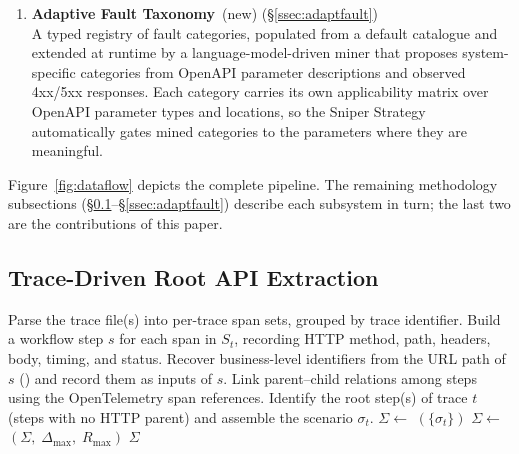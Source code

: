 \documentclass[conference]{IEEEtran}
\begin{document}
\begin{enumerate}[leftmargin=*]
  \item \textbf{Adaptive Fault Taxonomy}~(new)
        \hfill(\S\ref{ssec:adaptfault})\\
        A typed registry of fault categories, populated from a default catalogue and extended at runtime by a language-model-driven miner that proposes system-specific categories from OpenAPI parameter descriptions and observed 4xx/5xx responses. Each category carries its own applicability matrix over OpenAPI parameter types and locations, so the Sniper Strategy automatically gates mined categories to the parameters where they are meaningful.
\end{enumerate}

\noindent%
Figure~\ref{fig:dataflow} depicts the complete pipeline. The remaining methodology subsections (\S\ref{ssec:extract}--\S\ref{ssec:adaptfault}) describe each subsystem in turn; the last two are the contributions of this paper.

\subsection{Trace-Driven Root API Extraction}
\label{ssec:extract}
\begin{algorithm}[tb]
\caption{Trace workflow extraction}\label{alg:extract}
\footnotesize
\begin{algorithmic}[1]
\Require{}
\Ensure{}
\State Parse the trace file(s) into per-trace span sets, grouped by trace identifier.
    \State Build a workflow step $s$ for each span in $S_t$, recording HTTP method, path, headers, body, timing, and status.
    \State Recover business-level identifiers from the URL path of $s$ () and record them as inputs of $s$.
    \State Link parent--child relations among steps using the OpenTelemetry span references.
    \State Identify the root step(s) of trace $t$ (steps with no HTTP parent) and assemble the scenario $\sigma_t$.
\EndFor
\State $\Sigma \gets$ $(\{\sigma_t\})$ 
\State $\Sigma \gets$ $(\Sigma,\;\Delta_{\max},\;R_{\max})$ 
\State \Return $\Sigma$
\end{algorithmic}
\end{algorithm}
\end{document}
